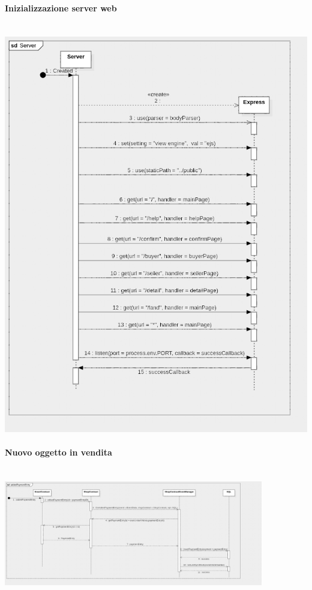 \documentclass[a4paper, 12pt]{article}
\begin{document}
\paragraph{Inizializzazione server web}\\
\includegraphics[width=1.0\textwidth]{server}
\clearpage
\paragraph{Nuovo oggetto in vendita}\\
\includegraphics[width=0.85\textwidth]{entry}
\end{document}
